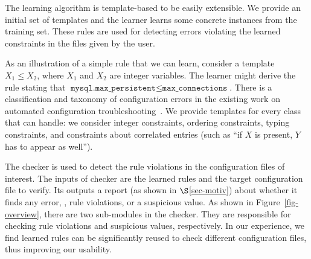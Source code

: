 The learning algorithm is template-based to be easily extensible. 
We provide an initial set of templates and the
learner learns some concrete instances from the training set. These
rules are used for detecting errors violating the learned constraints
in the files given by the user.

As an illustration of a simple rule that we can learn, consider a template
 $X_1 \le X_2$, where $X_1$ and $X_2$ are
integer variables. The learner might derive the rule stating that
$\texttt{mysql.max\_persistent} \le \texttt{max\_connections}$. There is a classification and taxonomy of configuration errors in the 
existing work on automated configuration troubleshooting~\cite{yin11anempirical, configdataset}. We provide templates for every class that \app can handle: we consider integer constraints, ordering
constraints, typing constraints, and constraints about correlated entries (such as ``if $X$ is present, $Y$ has to appear as well''). 

The checker is used to detect the rule violations in the configuration
files of interest. The inputs of checker are the learned rules 
and the target configuration file to verify.
Its outputs a report (as shown in $\S$\ref{sec-motiv}) about 
whether it finds any error, \eg, rule violations, or a suspicious value.
As shown in Figure~\ref{fig-overview},
there are two sub-modules in the checker. They are responsible for
checking rule violations and suspicious values, respectively.
In our experience, we find learned rules can be significantly reused
to check different configuration files, thus improving our usability.  

